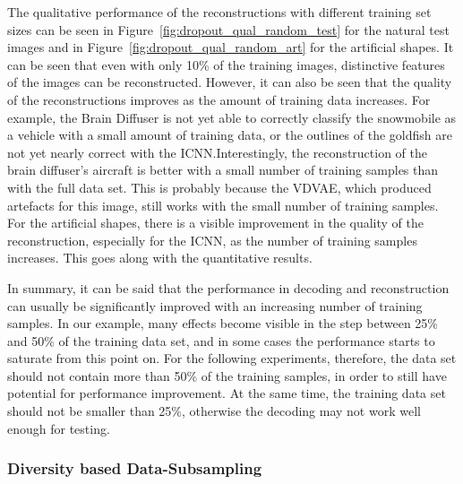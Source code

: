The qualitative performance of the reconstructions with different training set sizes can be seen in Figure~\ref{fig:dropout_qual_random_test} for the natural test images and in Figure~\ref{fig:dropout_qual_random_art} for the artificial shapes. It can be seen that even with only 10\% of the training images, distinctive features of the images can be reconstructed. However, it can also be seen that the quality of the reconstructions improves as the amount of training data increases. For example, the Brain Diffuser is not yet able to correctly classify the snowmobile as a vehicle with a small amount of training data, or the outlines of the goldfish are not yet nearly correct with the ICNN.\@ Interestingly, the reconstruction of the brain diffuser's aircraft is better with a small number of training samples than with the full data set. This is probably because the VDVAE, which produced artefacts for this image, still works with the small number of training samples. For the artificial shapes, there is a visible improvement in the quality of the reconstruction, especially for the ICNN, as the number of training samples increases. This goes along with the quantitative results.

In summary, it can be said that the performance in decoding and reconstruction can usually be significantly improved with an increasing number of training samples. In our example, many effects become visible in the step between 25\% and 50\% of the training data set, and in some cases the performance starts to saturate from this point on. For the following experiments, therefore, the data set should not contain more than 50\% of the training samples, in order to still have potential for performance improvement. At the same time, the training data set should not be smaller than 25\%, otherwise the decoding may not work well enough for testing.

\subsubsection{Diversity based Data-Subsampling}

